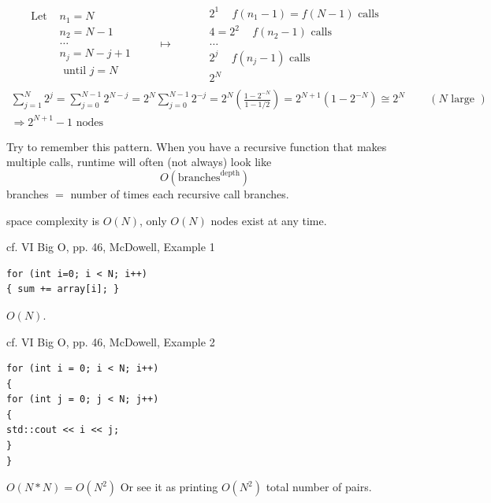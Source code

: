 \documentclass[10pt]{amsart}
\begin{document}
\[
\begin{gathered}
\begin{aligned}
\text{ Let } & n_1 = N \\
& n_2 = N - 1 \\
& \dots  \\
& n_j = N - j + 1 \\
& \text{ until } j = N 
\end{aligned} \qquad \mapsto \qquad 
\begin{aligned}
& 2^1 \quad \, f(n_1 - 1) = f(N-1) \text{ calls } \\ 
& 4 = 2^2 \quad \, f(n_2- 1) \text{ calls }  \\
& \dots \\
& 2^j \quad \, f(n_j - 1) \text{ calls }  \\
& 2^N 
\end{aligned}
\end{gathered}
\]
\[
\begin{gathered}
\sum_{j=1}^N 2^j = \sum_{j=0}^{N-1} 2^{N-j} = 2^N \sum_{j=0}^{N-1} 2^{-j} = 2^N \left(\frac{ 1 - 2^{-N} }{ 1 - 1/2} \right) = 2^{N+1} (1- 2^{-N}) \cong 2^N \qquad \, (N \text{ large }) \\ 
\Longrightarrow 2^{N+1} -1 \text{ nodes } 
\end{gathered}
\]

Try to remember this pattern. When you have a recursive function that makes multiple calls, runtime will often (not always) look like
\begin{equation}
\boxed{ O(\text{branches}^{\text{depth}}) }
\end{equation}
branches $=$ number of times each recursive call branches.

space complexity is $O(N)$, only $O(N)$ nodes exist at any time.

cf. VI Big O, pp. 46, McDowell, Example 1

\begin{verbatim}
for (int i=0; i < N; i++)
{ sum += array[i]; }
\end{verbatim}
$O(N)$.

cf. VI Big O, pp. 46, McDowell, Example 2

\begin{verbatim}
for (int i = 0; i < N; i++)
{
for (int j = 0; j < N; j++)
{
std::cout << i << j;
}
}
\end{verbatim}

$O(N*N)= O(N^2)$ Or see it as printing $O(N^2)$ total number of pairs.
\end{document}
